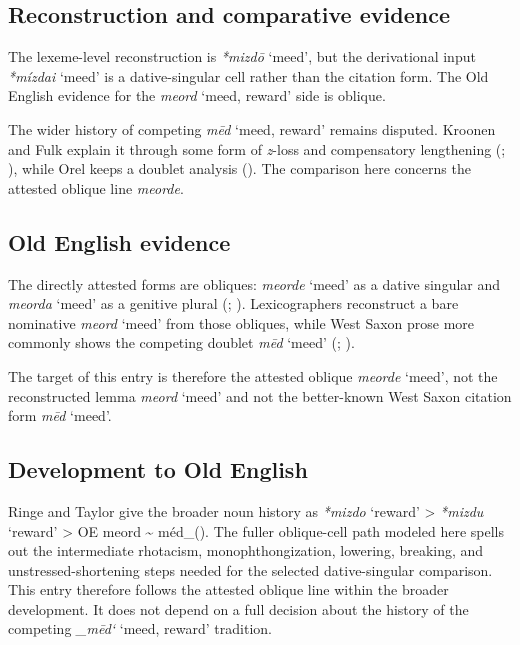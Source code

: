 \documentclass[
  british,
  a4paper,
  openany]{book}
\providecommand{\Recon}[1]{\emph{*#1}}
{\catcode`→=\active \global\def→{\ensuremath{\rightarrow}}}
\providecommand{\Recon}[1]{\emph{*#1}}
{\catcode`→=\active \global\def→{\ensuremath{\rightarrow}}}
\begin{document}
\subsection{Reconstruction and comparative
evidence}\label{reconstruction-and-comparative-evidence-119}

The lexeme-level reconstruction is {\Recon{mizdō} `meed'}, but the
derivational input {\Recon{mízdai} `meed'} is a dative-singular cell
rather than the citation form. The Old English evidence for the
{\emph{meord}} `meed, reward' side is oblique.

The wider history of competing {\emph{mēd}} `meed, reward' remains
disputed. Kroonen and Fulk explain it through some form of \emph{z}-loss
and compensatory lengthening (; ), while Orel keeps a
doublet analysis (). The
comparison here concerns the attested oblique line \emph{meorde}.

\subsection{Old English evidence}\label{old-english-evidence-119}

The directly attested forms are obliques: {\emph{meorde}} `meed' as a
dative singular and {\emph{meorda}} `meed' as a genitive plural
(;
).
Lexicographers reconstruct a bare nominative {\emph{meord}} `meed' from
those obliques, while West Saxon prose more commonly shows the competing
doublet \emph{mēd} `meed' (; ).

The target of this entry is therefore the attested oblique
{\emph{meorde}} `meed', not the reconstructed lemma {\emph{meord}}
`meed' and not the better-known West Saxon citation form \emph{mēd}
`meed'.

\subsection{Development to Old
English}\label{development-to-old-english-119}

Ringe and Taylor give the broader noun history as \Recon{mizdo} `reward'
\textgreater{} \Recon{mizdu} `reward' \textgreater{} OE meord
\textasciitilde{} méd\_(). The fuller oblique-cell path modeled here spells out the
intermediate rhotacism, monophthongization, lowering, breaking, and
unstressed-shortening steps needed for the selected dative-singular
comparison. This entry therefore follows the attested oblique line
within the broader development. It does not depend on a full decision
about the history of the competing {\emph{\_mēd`}} `meed, reward'
tradition.
\end{document}
